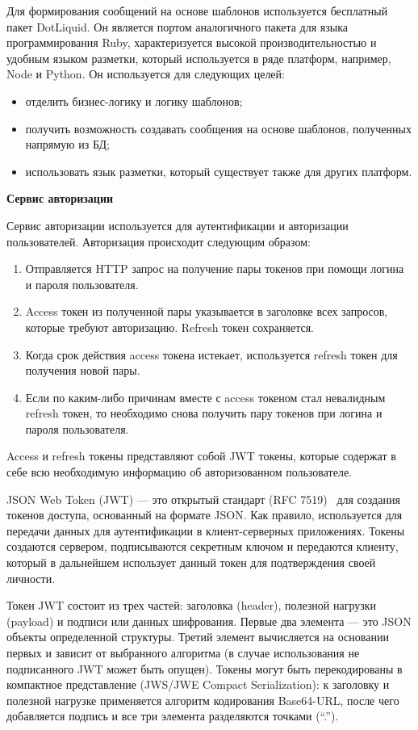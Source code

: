 Для формирования сообщений на основе шаблонов используется бесплатный пакет DotLiquid. Он является портом аналогичного пакета для языка программирования Ruby, характеризуется высокой производительностью и удобным языком разметки, который используется в ряде платформ, например, Node и Python. Он используется для следующих целей:
\begin{itemize}
    \item отделить бизнес-логику и логику шаблонов;
    \item получить возможность создавать сообщения на основе шаблонов, полученных напрямую из БД;
    \item использовать язык разметки, который существует также для других платформ.
\end{itemize}

\bigskip
\textbf{Сервис авторизации}

Сервис авторизации используется для аутентификации и авторизации пользователей. Авторизация происходит следующим образом:

\begin{enumerate}
    \item Отправляется HTTP запрос на получение пары токенов при помощи логина и пароля пользователя.
    \item Access токен из полученной пары указывается в заголовке всех запросов, которые требуют авторизацию. Refresh токен сохраняется.
    \item Когда срок действия access токена истекает, используется refresh токен для получения новой пары.
    \item Если по каким-либо причинам вместе с access токеном стал невалидным refresh токен, то необходимо снова получить пару токенов при логина и пароля пользователя.
\end{enumerate}

Access и refresh токены представляют собой JWT токены, которые содержат в себе всю необходимую информацию об авторизованном пользователе.

JSON Web Token (JWT) — это открытый стандарт (RFC 7519)~\cite{jwt} для создания токенов доступа, основанный на формате JSON. Как правило, используется для передачи данных для аутентификации в клиент-серверных приложениях. Токены создаются сервером, подписываются секретным ключом и передаются клиенту, который в дальнейшем использует данный токен для подтверждения своей личности.

Токен JWT состоит из трех частей: заголовка (header), полезной нагрузки (payload) и подписи или данных шифрования. Первые два элемента — это JSON объекты определенной структуры. Третий элемент вычисляется на основании первых и зависит от выбранного алгоритма (в случае использования не подписанного JWT может быть опущен). Токены могут быть перекодированы в компактное представление (JWS/JWE Compact Serialization): к заголовку и полезной нагрузке применяется алгоритм кодирования Base64-URL, после чего добавляется подпись и все три элемента разделяются точками (``.'').


